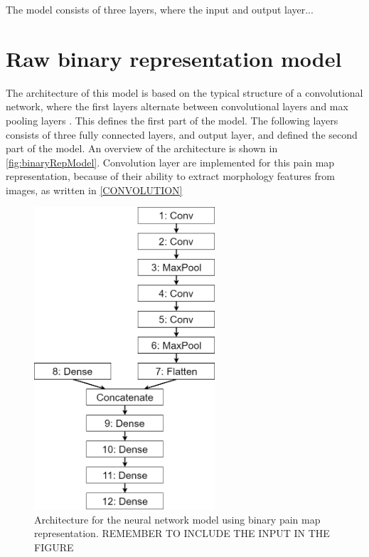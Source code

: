 The model consists of three layers, where the input and output layer... 




\section{Raw binary representation model}\label{sec:binaryRepModel}
The architecture of this model is based on the typical structure of a convolutional network, where the first layers alternate between convolutional layers and max pooling layers \citep{LeCun2015}. This defines the first part of the model. The following layers consists of three fully connected layers, and output layer, and defined the second part of the model. An overview of the architecture is shown in \autoref{fig:binaryRepModel}.  
Convolution layer are implemented for this pain map representation, because of their ability to extract morphology features from images, as written in \autoref{CONVOLUTION}

\begin{figure} [H]
\centering
\includegraphics[width=0.6\textwidth]{figures/binaryRepModel}
\caption{Architecture for the neural network model using binary pain map representation. REMEMBER TO INCLUDE THE INPUT IN THE FIGURE}
\label{fig:binaryRepModel}  
\end{figure}

